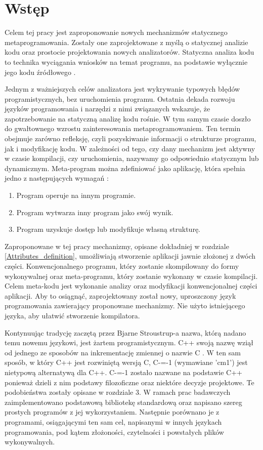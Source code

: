 \section{Wstęp}
Celem tej pracy jest zaproponowanie nowych mechanizmów statycznego 
metaprogramowania.
Zostały one zaprojektowane z myślą o statycznej analizie kodu oraz prostocie projektowania nowych analizatorów.
Statyczna analiza kodu to technika wyciągania wniosków na temat programu, na podstawie wyłącznie jego kodu źródłowego \cite{survey_of_metaprograming}.

Jednym z ważniejszych celów analizatora jest wykrywanie typowych błędów programistycznych, bez uruchomienia programu.
Ostatnia dekada rozwoju języków programowania i narzędzi z nimi związanych wskazuje, że zapotrzebowanie na statyczną analizę kodu rośnie.
W tym samym czasie doszło do gwałtownego wzrostu zainteresowania metaprogramowaniem. Ten termin obejmuje zarówno refleksję, czyli pozyskiwanie informacji o strukturze programu, jak i modyfikację kodu. W zależności od tego, czy dany mechanizm jest aktywny w czasie kompilacji, czy uruchomienia, nazywamy go odpowiednio statycznym lub dynamicznym.
Meta-program można zdefiniować jako aplikację, która spełnia jedno z następujących wymagań \cite{nielson2004principles}:
\begin{enumerate}
\item Program operuje na innym programie.
\item Program wytwarza inny program jako swój wynik.
\item Program uzyskuje dostęp lub modyfikuje własną strukturę.
\end{enumerate}

Zaproponowane w tej pracy mechanizmy, opisane dokładniej w rozdziale \ref{Attributes_definition}, umożliwiają stworzenie aplikacji jawnie złożonej z dwóch części.
Konwencjonalnego programu, który zostanie skompilowany do formy wykonywalnej oraz meta-programu, który zostanie wykonany w czasie kompilacji.
Celem meta-kodu jest wykonanie analizy oraz modyfikacji konwencjonalnej części aplikacji.
Aby to osiągnąć, zaprojektowany został nowy, uproszczony język programowania zawierający proponowane mechanizmy.
Nie użyto istniejącego języka, aby ułatwić stworzenie kompilatora.

Kontynuując tradycję zaczętą przez Bjarne Stroustrup-a nazwa, którą nadano temu nowemu językowi, jest żartem programistycznym. C++ swoją nazwę wziął od jednego ze sposobów na inkrementację zmiennej o nazwie C \cite{stroustrup_com}. 
W ten sam sposób, w który C++ jest rozwiniętą wersją C, C-=-1 (wymawiane 'cm1') jest nietypową alternatywą dla C++. C-=-1 zostało nazwane na podstawie C++ ponieważ dzieli z nim podstawy filozoficzne oraz niektóre decyzje projektowe. Te podobieństwa zostały opisane w rozdziale 3.
W ramach prac badawczych zaimplementowano podstawową bibliotekę standardową oraz napisano szereg prostych programów z jej wykorzystaniem. Następnie porównano je z programami, osiągającymi ten sam cel, napisanymi w innych językach programowania, pod kątem złożoności, czytelności i powstałych plików wykonywalnych.
